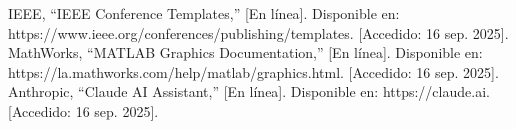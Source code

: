 \documentclass[journal]{IEEEtran} %
\begin{document}



\begin{thebibliography}{00}
     IEEE, ``IEEE Conference Templates,'' [En línea]. Disponible en: https://www.ieee.org/conferences/publishing/templates. [Accedido: 16 sep. 2025].
     MathWorks, ``MATLAB Graphics Documentation,'' [En línea]. Disponible en: https://la.mathworks.com/help/matlab/graphics.html. [Accedido: 16 sep. 2025].
     Anthropic, ``Claude AI Assistant,'' [En línea]. Disponible en: https://claude.ai. [Accedido: 16 sep. 2025].
\end{thebibliography}
\vspace{12pt}
\end{document}
